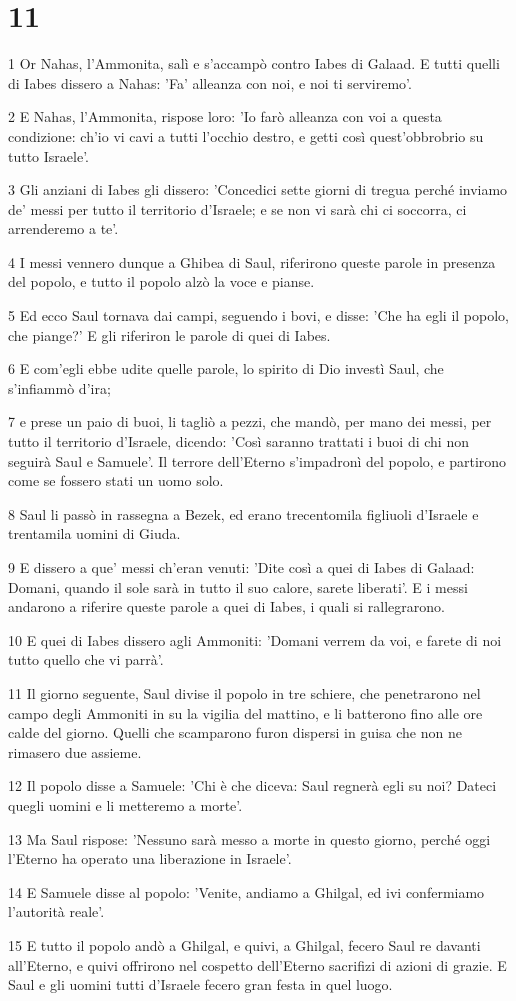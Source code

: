 \chapter{11}

\par 1 Or Nahas, l'Ammonita, salì e s'accampò contro Iabes di Galaad. E tutti quelli di Iabes dissero a Nahas: 'Fa' alleanza con noi, e noi ti serviremo'.
\par 2 E Nahas, l'Ammonita, rispose loro: 'Io farò alleanza con voi a questa condizione: ch'io vi cavi a tutti l'occhio destro, e getti così quest'obbrobrio su tutto Israele'.
\par 3 Gli anziani di Iabes gli dissero: 'Concedici sette giorni di tregua perché inviamo de' messi per tutto il territorio d'Israele; e se non vi sarà chi ci soccorra, ci arrenderemo a te'.
\par 4 I messi vennero dunque a Ghibea di Saul, riferirono queste parole in presenza del popolo, e tutto il popolo alzò la voce e pianse.
\par 5 Ed ecco Saul tornava dai campi, seguendo i bovi, e disse: 'Che ha egli il popolo, che piange?' E gli riferiron le parole di quei di Iabes.
\par 6 E com'egli ebbe udite quelle parole, lo spirito di Dio investì Saul, che s'infiammò d'ira;
\par 7 e prese un paio di buoi, li tagliò a pezzi, che mandò, per mano dei messi, per tutto il territorio d'Israele, dicendo: 'Così saranno trattati i buoi di chi non seguirà Saul e Samuele'. Il terrore dell'Eterno s'impadronì del popolo, e partirono come se fossero stati un uomo solo.
\par 8 Saul li passò in rassegna a Bezek, ed erano trecentomila figliuoli d'Israele e trentamila uomini di Giuda.
\par 9 E dissero a que' messi ch'eran venuti: 'Dite così a quei di Iabes di Galaad: Domani, quando il sole sarà in tutto il suo calore, sarete liberati'. E i messi andarono a riferire queste parole a quei di Iabes, i quali si rallegrarono.
\par 10 E quei di Iabes dissero agli Ammoniti: 'Domani verrem da voi, e farete di noi tutto quello che vi parrà'.
\par 11 Il giorno seguente, Saul divise il popolo in tre schiere, che penetrarono nel campo degli Ammoniti in su la vigilia del mattino, e li batterono fino alle ore calde del giorno. Quelli che scamparono furon dispersi in guisa che non ne rimasero due assieme.
\par 12 Il popolo disse a Samuele: 'Chi è che diceva: Saul regnerà egli su noi? Dateci quegli uomini e li metteremo a morte'.
\par 13 Ma Saul rispose: 'Nessuno sarà messo a morte in questo giorno, perché oggi l'Eterno ha operato una liberazione in Israele'.
\par 14 E Samuele disse al popolo: 'Venite, andiamo a Ghilgal, ed ivi confermiamo l'autorità reale'.
\par 15 E tutto il popolo andò a Ghilgal, e quivi, a Ghilgal, fecero Saul re davanti all'Eterno, e quivi offrirono nel cospetto dell'Eterno sacrifizi di azioni di grazie. E Saul e gli uomini tutti d'Israele fecero gran festa in quel luogo.

